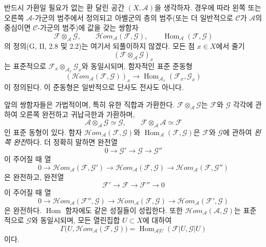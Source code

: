\begin{env}[4.1.5]
\label{0.4.1.5-ko}
반드시 가환일 필요가 없는 환 달린 공간 $(X,\mathcal A)$을 생각하자. 경우에 따라 왼쪽 또는 오른쪽 $\mathcal A$-가군의 범주에서 정의되고 아벨군의 층의 범주(또는 더
일반적으로 $\mathcal C$가 $\mathcal A$의 중심이면 $\mathcal C$-가군의 범주)에 값을 갖는 쌍함자
\[
  \mathcal F\otimes_{\mathcal A}\mathcal G,
  \qquad
  \mathcal H\!om_{\mathcal A}(\mathcal F,\mathcal G),
  \qquad
  \operatorname{Hom}_{\mathcal A}(\mathcal F,\mathcal G)
\]
의 정의(G, II, 2.8 및 2.2)는 여기서 되풀이하지 않겠다. 모든 점 $x\in X$에서 줄기
\[
  (\mathcal F\otimes_{\mathcal A}\mathcal G)_x
\]
는 표준적으로 $\mathcal F_x\otimes_{\mathcal A_x}\mathcal G_x$와 동일시되며, 함자적인 표준 준동형
\[
  (\mathcal H\!om_{\mathcal A}(\mathcal F,\mathcal G))_x
  \longrightarrow
  \operatorname{Hom}_{\mathcal A_x}(\mathcal F_x,\mathcal G_x)
\]
이 정의된다. 이 준동형은 일반적으로 단사도 전사도 아니다.

앞의 쌍함자들은 가법적이며, 특히 유한 직합과 가환한다. $\mathcal F\otimes_{\mathcal A}\mathcal G$는 $\mathcal F$와 $\mathcal G$ 각각에 관하여 오른쪽 완전하고 귀납극한과 가환하며,
\[
  \mathcal A\otimes_{\mathcal A}\mathcal G
  \simeq\mathcal G,
  \qquad
  \mathcal F\otimes_{\mathcal A}\mathcal A
  \simeq\mathcal F
\]
인 표준 동형이 있다. 함자 $\mathcal H\!om_{\mathcal A}(\mathcal F,\mathcal G)$와 $\operatorname{Hom}_{\mathcal A}(\mathcal F,\mathcal G)$은 $\mathcal F$와 $\mathcal G$에 관하여 \emph{왼쪽 완전}하다. 더 정확히 말하면 완전열
\[
  0\longrightarrow\mathcal G'
  \longrightarrow\mathcal G
  \longrightarrow\mathcal G''
\]
이 주어질 때 열
\[
  0\longrightarrow
  \mathcal H\!om_{\mathcal A}(\mathcal F,\mathcal G')
  \longrightarrow
  \mathcal H\!om_{\mathcal A}(\mathcal F,\mathcal G)
  \longrightarrow
  \mathcal H\!om_{\mathcal A}(\mathcal F,\mathcal G'')
\]
은 완전하고, 완전열
\[
  \mathcal F'\longrightarrow\mathcal F
  \longrightarrow\mathcal F''\longrightarrow0
\]
이 주어질 때 열
\[
  0\longrightarrow
  \mathcal H\!om_{\mathcal A}(\mathcal F'',\mathcal G)
  \longrightarrow
  \mathcal H\!om_{\mathcal A}(\mathcal F,\mathcal G)
  \longrightarrow
  \mathcal H\!om_{\mathcal A}(\mathcal F',\mathcal G)
\]
은 완전하다. $\operatorname{Hom}$ 함자에도 같은 성질들이 성립한다. 또한 $\mathcal H\!om_{\mathcal A}(\mathcal A,\mathcal G)$는 표준적으로 $\mathcal G$와 동일시되며, 모든 열린집합 $U\subset X$에 대하여
\[
  \Gamma\bigl(U,\mathcal H\!om_{\mathcal A}(\mathcal F,\mathcal G)\bigr)
  =
  \operatorname{Hom}_{\mathcal A|U}(\mathcal F|U,\mathcal G|U)
\]
이다.


\end{env}
